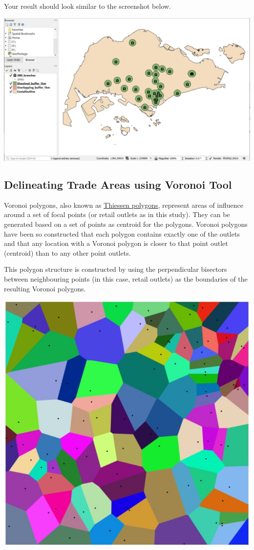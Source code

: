 \documentclass[
  letterpaper,
  DIV=11,
  numbers=noendperiod]{scrreprt}
\begin{document}
Your result should look similar to the screenshot below.

\includegraphics{./img05/image19.jpg}

\hypertarget{delineating-trade-areas-using-voronoi-tool}{%
\subsection{Delineating Trade Areas using Voronoi
Tool}\label{delineating-trade-areas-using-voronoi-tool}}

Voronoi polygons, also known as
\href{http://h2g2.com/dna/h2g2/A901937}{Thiessen polygons}, represent
areas of influence around a set of focal points (or retail outlets as in
this study). They can be generated based on a set of points as centroid
for the polygons. Voronoi polygons have been so constructed that each
polygon contains exactly one of the outlets and that any location with a
Voronoi polygon is closer to that point outlet (centroid) than to any
other point outlets.

This polygon structure is constructed by using the perpendicular
bisectors between neighbouring points (in this case, retail outlets) as
the boundaries of the resulting Voronoi polygons.

\includegraphics{./img05/image20.jpg}
\end{document}
